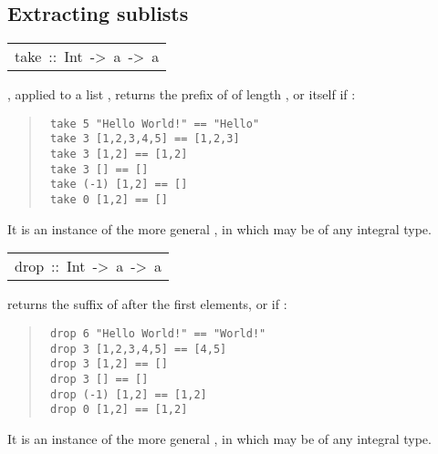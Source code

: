\subsection{Extracting sublists
}
\begin{haddockdesc}
\item[\begin{tabular}{@{}l}
take\ ::\ Int\ ->\ {\char 91}a{\char 93}\ ->\ {\char 91}a{\char 93}
\end{tabular}]\haddockbegindoc
{} , applied to a list , returns the prefix of 
 of length , or  itself if :
\par
\begin{quote}
{\haddockverb\begin{verbatim}
 take 5 "Hello World!" == "Hello"
 take 3 [1,2,3,4,5] == [1,2,3]
 take 3 [1,2] == [1,2]
 take 3 [] == []
 take (-1) [1,2] == []
 take 0 [1,2] == []
\end{verbatim}}
\end{quote}
It is an instance of the more general ,
 in which  may be of any integral type.
\par

\end{haddockdesc}
\begin{haddockdesc}
\item[\begin{tabular}{@{}l}
drop\ ::\ Int\ ->\ {\char 91}a{\char 93}\ ->\ {\char 91}a{\char 93}
\end{tabular}]\haddockbegindoc
{}  returns the suffix of 
 after the first  elements, or  if :
\par
\begin{quote}
{\haddockverb\begin{verbatim}
 drop 6 "Hello World!" == "World!"
 drop 3 [1,2,3,4,5] == [4,5]
 drop 3 [1,2] == []
 drop 3 [] == []
 drop (-1) [1,2] == [1,2]
 drop 0 [1,2] == [1,2]
\end{verbatim}}
\end{quote}
It is an instance of the more general ,
 in which  may be of any integral type.
\par

\end{haddockdesc}
